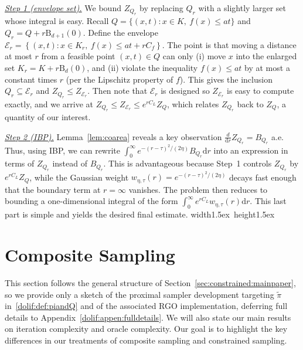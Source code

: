 \documentclass[11pt,letterpaper]{article}
\newcommand{\ball}{\mathrm{B}}
\newcommand{\D}{\mathrm{d}}
\newcommand*{\QEDA}{\hfill\hbox{\vrule width1.5ex height1.5ex}}
\begin{document}
\underline{\emph{Step 1 (envelope set).}}
We bound $Z_{Q_r}$ by replacing $Q_r$ with a slightly larger set whose
integral is easy. Recall $Q=\{(x,t):x\in K,\ f(x)\le a t\}$ and
$Q_r=Q+r\ball_{d+1}(0)$.  Define the envelope $\mathcal E_r=
\left\{(x,t): x\in K_r,\ f(x)\le a t + r C_f\right\}$. The point is that moving a distance at most $r$ from a feasible point $(x,t)\in Q$
can only (i) move $x$ into the enlarged set $K_r=K+r\ball_{d}(0)$, and (ii) violate the inequality
$f(x)\le at$ by at most a constant times $r$ (per the Lipschitz property of $f$). This gives the inclusion $Q_r\subseteq \mathcal E_r$ and $Z_{Q_r}\le Z_{\mathcal E_r}$. Then note that $\mathcal E_r$ is designed so $Z_{\mathcal E_r}$ is easy to compute exactly, and we arrive at 
$Z_{Q_r}\le Z_{\mathcal E_r}\le e^{rC_L}Z_Q$, which relates $Z_{Q_r}$ back to $Z_Q$, a quantity of our interest.


\underline{\emph{Step 2 (IBP).}}
Lemma~\ref{lem:coarea} reveals a key observation $\frac{d}{\D r}Z_{Q_r}=B_{Q_r}$ a.e. Thus, using IBP, we can rewrite $\int_0^\infty e^{-(r-\tau)^2/(2\eta)} B_{Q_r} \D r$ into an expression in terms of $Z_{Q_r}$ instead of $B_{Q_r}$.
This is advantageous because Step~1 controls $Z_{Q_r}$ by
$e^{rC_L}Z_Q$, while the Gaussian weight $w_{\eta,\tau}(r)=e^{-(r-\tau)^2/(2\eta)}$ decays fast enough that
the boundary term at $r=\infty$ vanishes. The problem then reduces to bounding a
one-dimensional integral of the form
$\int_0^\infty e^{rC_L}w_{\eta,\tau}(r) \D r$. This last part is simple and yields the desired final estimate.  \QEDA



\section{Composite Sampling}
\label{sec:composite:mainpaper}

This section follows the general structure of Section~\ref{sec:constrained:mainpaper}, so we provide only a sketch of the proximal sampler development targeting $\tilde{\pi}$ in~\eqref{dolif:def:piandQ} and of the associated RGO implementation, deferring full details to Appendix~\ref{dolif:appen:fulldetails}. We will also state our main results on iteration complexity and oracle complexity. Our goal is to highlight the key differences in our treatments of composite sampling and constrained sampling.
\end{document}
